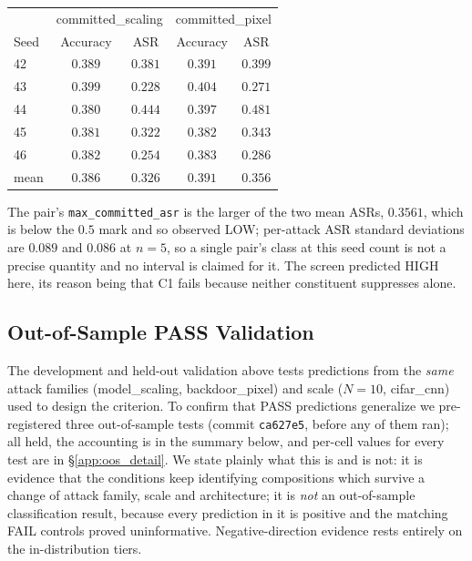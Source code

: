 \documentclass{article}
\begin{document}
\begin{center}\small
\begin{tabular}{l|cc|cc}
\toprule
 & \multicolumn{2}{c|}{committed\_scaling} & \multicolumn{2}{c}{committed\_pixel} \\
Seed & Accuracy & ASR & Accuracy & ASR \\
\midrule
42 & $0.389$ & $0.381$ & $0.391$ & $0.399$ \\
43 & $0.399$ & $0.228$ & $0.404$ & $0.271$ \\
44 & $0.380$ & $0.444$ & $0.397$ & $0.481$ \\
45 & $0.381$ & $0.322$ & $0.382$ & $0.343$ \\
46 & $0.382$ & $0.254$ & $0.383$ & $0.286$ \\
\midrule
mean & $0.386$ & $0.326$ & $0.391$ & $0.356$ \\
\bottomrule
\end{tabular}
\end{center}

\noindent The pair's \texttt{max\_committed\_asr} is the larger of the two mean ASRs, $0.3561$, which is below the $0.5$ mark and so observed LOW; per-attack ASR standard deviations are $0.089$ and $0.086$ at $n{=}5$, so a single pair's class at this seed count is not a precise quantity and no interval is claimed for it. The screen predicted HIGH here, its reason being that C1 fails because neither constituent suppresses alone.

\subsection{Out-of-Sample PASS Validation}
\label{sec:oos_pass}

The development and held-out validation above tests predictions from the \emph{same} attack families (model\_scaling, backdoor\_pixel) and scale ($N{=}10$, cifar\_cnn) used to design the criterion. To confirm that PASS predictions generalize we pre-registered three out-of-sample tests (commit \texttt{ca627e5}, before any of them ran); all held, the accounting is in the summary below, and per-cell values for every test are in §\ref{app:oos_detail}. We state plainly what this is and is not: it is evidence that the conditions keep identifying compositions which survive a change of attack family, scale and architecture; it is \emph{not} an out-of-sample classification result, because every prediction in it is positive and the matching FAIL controls proved uninformative. Negative-direction evidence rests entirely on the in-distribution tiers.
\end{document}
